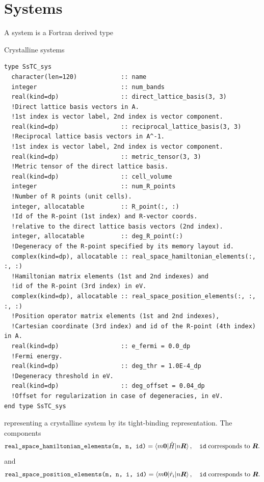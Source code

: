 \documentclass[10pt,a4paper]{article}
\begin{document}
\section{Systems}
A system is a Fortran derived type
\begin{codebox}{Crystalline systems}
\begin{lstlisting}[caption={Derived type corresponding to a system.},captionpos=b]
type SsTC_sys
  character(len=120)            :: name
  integer                       :: num_bands
  real(kind=dp)                 :: direct_lattice_basis(3, 3)               
  !Direct lattice basis vectors in A.
  !1st index is vector label, 2nd index is vector component.
  real(kind=dp)                 :: reciprocal_lattice_basis(3, 3)           
  !Reciprocal lattice basis vectors in A^-1.
  !1st index is vector label, 2nd index is vector component.
  real(kind=dp)                 :: metric_tensor(3, 3)
  !Metric tensor of the direct lattice basis.
  real(kind=dp)                 :: cell_volume
  integer                       :: num_R_points
  !Number of R points (unit cells).
  integer, allocatable          :: R_point(:, :)
  !Id of the R-point (1st index) and R-vector coords.
  !relative to the direct lattice basis vectors (2nd index).
  integer, allocatable          :: deg_R_point(:)
  !Degeneracy of the R-point specified by its memory layout id.
  complex(kind=dp), allocatable :: real_space_hamiltonian_elements(:, :, :)
  !Hamiltonian matrix elements (1st and 2nd indexes) and
  !id of the R-point (3rd index) in eV.
  complex(kind=dp), allocatable :: real_space_position_elements(:, :, :, :)
  !Position operator matrix elements (1st and 2nd indexes),
  !Cartesian coordinate (3rd index) and id of the R-point (4th index) in A.
  real(kind=dp)                 :: e_fermi = 0.0_dp
  !Fermi energy.
  real(kind=dp)                 :: deg_thr = 1.0E-4_dp
  !Degeneracy threshold in eV.
  real(kind=dp)                 :: deg_offset = 0.04_dp
  !Offset for regularization in case of degeneracies, in eV.
end type SsTC_sys
\end{lstlisting}
\end{codebox}
representing a crystalline system by its tight-binding \cite{marzariMaximallyLocalizedWannier2012} representation. The components
\begin{equation}
\verb|real_space_hamiltonian_elements(m, n, id)| = \braket{m\bm{0}|\hat{H}|n\bm{R}},\quad \verb|id|\;\text{corresponds to }\bm{R}.
\end{equation}
and
\begin{equation}
\verb|real_space_position_elements(m, n, i, id)| = \braket{m\bm{0}|\hat{r}_i|n\bm{R}},\quad \verb|id|\;\text{corresponds to }\bm{R}.
\end{equation}
\end{document}
